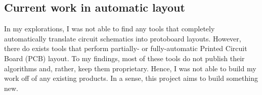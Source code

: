 \subsection{Current work in automatic layout}

In my explorations, I was not able to find any tools that completely
automatically translate circuit schematics into protoboard layouts.
However, there
do exists tools that perform partially- or fully-automatic Printed Circuit
Board (PCB) layout. To my findings, most of these tools do not publish their
algorithms and, rather, keep them proprietary. Hence, I was not able to build my
work off of any existing products. In a sense, this project aims to build
something new.
